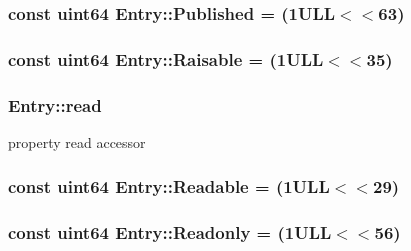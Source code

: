 \subsubsection[{Published}]{\setlength{\rightskip}{0pt plus 5cm}const {\bf uint64} Entry\+::\+Published = (1\+U\+L\+L$<$$<$63)\hspace{0.3cm}{\ttfamily [static]}}\label{class_entry_a2dffe3090d7636a879832be07aec6a0a}
\hypertarget{class_entry_af29e470caff223862bd5da2ebbc2dae3}{}
\subsubsection[{Raisable}]{\setlength{\rightskip}{0pt plus 5cm}const {\bf uint64} Entry\+::\+Raisable = (1\+U\+L\+L$<$$<$35)\hspace{0.3cm}{\ttfamily [static]}}\label{class_entry_af29e470caff223862bd5da2ebbc2dae3}
\hypertarget{class_entry_ac5ad6c6585645a4427b54e5281316b65}{}
\subsubsection[{read}]{ Entry\+::read}\label{class_entry_ac5ad6c6585645a4427b54e5281316b65}


property read accessor 

\hypertarget{class_entry_a96ae6836464b455d422a5caec657aa52}{}
\subsubsection[{Readable}]{\setlength{\rightskip}{0pt plus 5cm}const {\bf uint64} Entry\+::\+Readable = (1\+U\+L\+L$<$$<$29)\hspace{0.3cm}{\ttfamily [static]}}\label{class_entry_a96ae6836464b455d422a5caec657aa52}
\hypertarget{class_entry_a6560e43e64a7c5a4b579f6888c9f12f0}{}
\subsubsection[{Readonly}]{\setlength{\rightskip}{0pt plus 5cm}const {\bf uint64} Entry\+::\+Readonly = (1\+U\+L\+L$<$$<$56)\hspace{0.3cm}{\ttfamily [static]}}\label{class_entry_a6560e43e64a7c5a4b579f6888c9f12f0}
\hypertarget{class_entry_a530abd3056891add4d91ef6b26a55ca1}{}
